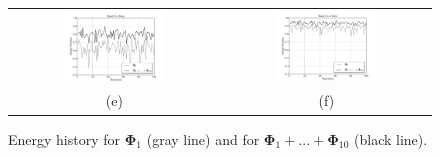 \documentclass[12pt,a4paper]{article}
\newcommand{\bv}[1]{\mathbf{#1}}
\begin{document}
\begin{figure}[h]
\begin{tabular}{cc}
 \includegraphics[width=0.5\textwidth]{./imgs/energy5.pdf} & \includegraphics[width=0.5\textwidth]{./imgs/energy6.pdf} \\
(e) & (f)
\end{tabular}
 \caption{Energy history for $\bv{\Phi}_1$ (gray line) and for $\bv{\Phi}_{1}+...+\bv{\Phi}_{10}$ (black line).}
 \label{fig: energy_hist}
\end{figure}
\end{document}
